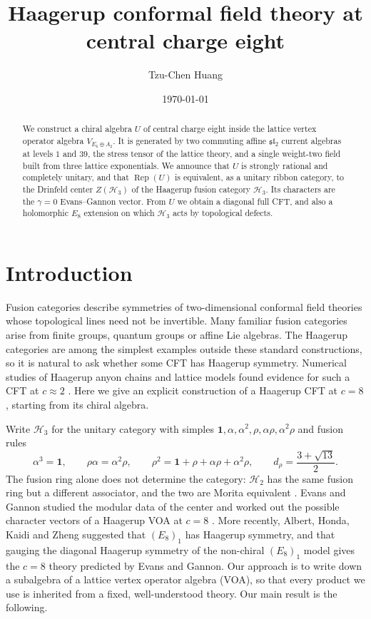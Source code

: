 \documentclass[11pt,a4paper]{article}
\title{Haagerup conformal field theory at central charge eight}
\author{Tzu-Chen Huang}
\date{\today}
\DeclareMathOperator{\Rep}{Rep}
\newcommand{\HH}{\mathcal H}
\newcommand{\one}{\mathbf1}
\begin{document}
\maketitle
\begin{abstract}
We construct a chiral algebra $U$ of central charge eight inside the
lattice vertex operator algebra $V_{E_6\oplus A_2}$. It is generated by
two commuting affine $\mathfrak{sl}_2$ current algebras at levels $1$ and $39$,
the stress tensor of the lattice theory, and a single weight-two field
built from three lattice exponentials. We announce that $U$ is strongly
rational and completely unitary, and that $\Rep(U)$ is equivalent, as a
unitary ribbon category, to the Drinfeld center $Z(\HH_3)$ of the
Haagerup fusion category $\HH_3$. Its characters are the $\gamma=0$
Evans--Gannon vector. From $U$ we obtain a diagonal full CFT, and also a
holomorphic $E_8$ extension on which $\HH_3$ acts by topological defects.
\end{abstract}

\section{Introduction}
Fusion categories describe symmetries of two-dimensional conformal
field theories whose topological lines need not be invertible. Many
familiar fusion categories arise from finite groups, quantum groups or
affine Lie algebras. The Haagerup categories are among the simplest
examples outside these standard constructions, so it is natural to ask
whether some CFT has Haagerup symmetry. Numerical studies of Haagerup anyon chains and
lattice models found evidence for such a CFT at $c\approx2$
\cite{HLOTT,VLVWOHV}. Here we give an explicit construction of a Haagerup CFT at $c=8$,
starting from its chiral algebra.

Write $\HH_3$ for the unitary category with simples $\one,\alpha,\alpha^2,\rho,\alpha\rho,\alpha^2\rho$ and fusion rules
\begin{equation}\label{eq:HI}
 \alpha^3=\one,\qquad \rho\alpha=\alpha^2\rho,\qquad
 \rho^2=\one+\rho+\alpha\rho+\alpha^2\rho,
 \qquad d_\rho=\frac{3+\sqrt{13}}2.
\end{equation}
The fusion ring alone does not determine the category: $\HH_2$ has the
same fusion ring but a different associator, and the two are Morita
equivalent \cite{Izumi,GS}. Evans and Gannon studied the modular data of
the center and worked out the possible character vectors of a Haagerup
VOA at $c=8$ \cite{EG}. More recently, Albert, Honda, Kaidi and Zheng \cite{AHKZ}
suggested that $(E_8)_1$ has Haagerup symmetry, and that gauging the
diagonal Haagerup symmetry of the non-chiral $(E_8)_1$ model gives the
$c=8$ theory predicted by Evans and Gannon.
Our approach is to write down a subalgebra of a lattice vertex operator algebra (VOA), so
that every product we use is inherited from a fixed, well-understood
theory. Our main result is the following.
\end{document}
